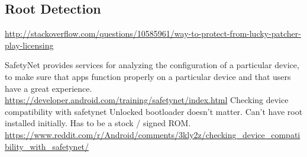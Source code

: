 \subsection{Root Detection}\label{subsection:counter-tampering-root}

\url{http://stackoverflow.com/questions/10585961/way-to-protect-from-lucky-patcher-play-licensing}\newline






SafetyNet provides services for analyzing the configuration of a particular device, to make sure that apps function properly on a particular device and that users have a great experience. \url{https://developer.android.com/training/safetynet/index.html} Checking device compatibility with safetynet\newline
Unlocked bootloader doesn't matter.
Can't have root installed initially.
Has to be a stock / signed ROM.
\url{https://www.reddit.com/r/Android/comments/3kly2z/checking_device_compatibility_with_safetynet/}
